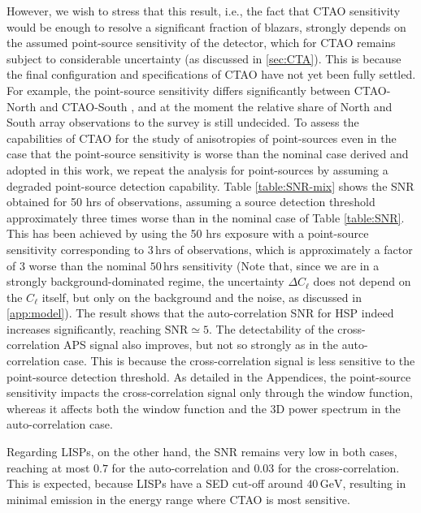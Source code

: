 However, we wish to stress that this result, i.e., the fact that CTAO sensitivity would be enough to resolve a significant fraction of blazars, 
strongly depends on the assumed point-source sensitivity of the detector, which for CTAO {remains subject to considerable uncertainty}  (as discussed in \cref{sec:CTA}). This is because the {final configuration and specifications of CTAO have not yet been fully settled.}  For example, the point-source sensitivity {differs significantly between}  CTAO-North and CTAO-South \cite{CTAConsortium:2017dvg}, and at the moment the relative share of North and South array observations to the survey is still undecided. To assess the capabilities of CTAO for the study of anisotropies of point-sources even in the case that the point-source sensitivity is worse than the nominal case derived and adopted in this work, we repeat the analysis for point-sources by assuming a degraded point-source detection capability. Table \ref{table:SNR-mix} shows the SNR obtained for 50 hrs of observations, assuming a source detection threshold approximately three times worse than in the nominal case of Table \ref{table:SNR}. This has been achieved by using the 50 hrs exposure with a point-source sensitivity corresponding to $3\,\textrm{hrs}$ of observations, which is approximately a factor of 3 worse than the nominal $50\,\textrm{hrs}$ sensitivity
(Note that, since we are in a strongly background-dominated regime, the uncertainty $\varDelta C_{\ell}$ does not depend on the $C_{\ell}$ itself, but only on the background and the noise, as discussed in \cref{app:model}).
The result shows that the auto-correlation SNR for HSP indeed increases significantly, reaching $\textrm{SNR} \simeq 5$.  The detectability of the cross-correlation APS signal also improves, but not so strongly as in the auto-correlation case. This is because the cross-correlation signal {is less sensitive to the point-source detection threshold. As detailed in the Appendices, the point-source sensitivity impacts the cross-correlation signal only through the window function, whereas it affects both the window function and the 3D power spectrum in the auto-correlation case.} 

Regarding LISPs, on the other hand, the SNR remains very low in both cases, reaching at most $0.7$ for the auto-correlation and $0.03$ for the cross-correlation. This is expected, because LISPs have a SED cut-off around $40\,\textrm{GeV}$, resulting in minimal emission in the energy range where CTAO is most sensitive. 

